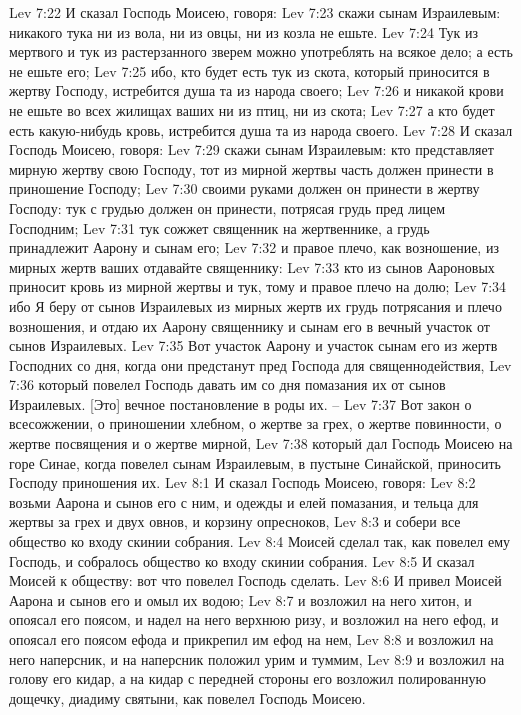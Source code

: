 Lev 7:22  И сказал Господь Моисею, говоря:
Lev 7:23  скажи сынам Израилевым: никакого тука ни из вола, ни из овцы, ни из козла не ешьте.
Lev 7:24  Тук из мертвого и тук из растерзанного зверем можно употреблять на всякое дело; а есть не ешьте его;
Lev 7:25  ибо, кто будет есть тук из скота, который приносится в жертву Господу, истребится душа та из народа своего;
Lev 7:26  и никакой крови не ешьте во всех жилищах ваших ни из птиц, ни из скота;
Lev 7:27  а кто будет есть какую-нибудь кровь, истребится душа та из народа своего.
Lev 7:28  И сказал Господь Моисею, говоря:
Lev 7:29  скажи сынам Израилевым: кто представляет мирную жертву свою Господу, тот из мирной жертвы часть должен принести в приношение Господу;
Lev 7:30  своими руками должен он принести в жертву Господу: тук с грудью должен он принести, потрясая грудь пред лицем Господним;
Lev 7:31  тук сожжет священник на жертвеннике, а грудь принадлежит Аарону и сынам его;
Lev 7:32  и правое плечо, как возношение, из мирных жертв ваших отдавайте священнику:
Lev 7:33  кто из сынов Аароновых приносит кровь из мирной жертвы и тук, тому и правое плечо на долю;
Lev 7:34  ибо Я беру от сынов Израилевых из мирных жертв их грудь потрясания и плечо возношения, и отдаю их Аарону священнику и сынам его в вечный участок от сынов Израилевых.
Lev 7:35  Вот участок Аарону и участок сынам его из жертв Господних со дня, когда они предстанут пред Господа для священнодействия,
Lev 7:36  который повелел Господь давать им со дня помазания их от сынов Израилевых. [Это] вечное постановление в роды их. --
Lev 7:37  Вот закон о всесожжении, о приношении хлебном, о жертве за грех, о жертве повинности, о жертве посвящения и о жертве мирной,
Lev 7:38  который дал Господь Моисею на горе Синае, когда повелел сынам Израилевым, в пустыне Синайской, приносить Господу приношения их.
Lev 8:1  И сказал Господь Моисею, говоря:
Lev 8:2  возьми Аарона и сынов его с ним, и одежды и елей помазания, и тельца для жертвы за грех и двух овнов, и корзину опресноков,
Lev 8:3  и собери все общество ко входу скинии собрания.
Lev 8:4  Моисей сделал так, как повелел ему Господь, и собралось общество ко входу скинии собрания.
Lev 8:5  И сказал Моисей к обществу: вот что повелел Господь сделать.
Lev 8:6  И привел Моисей Аарона и сынов его и омыл их водою;
Lev 8:7  и возложил на него хитон, и опоясал его поясом, и надел на него верхнюю ризу, и возложил на него ефод, и опоясал его поясом ефода и прикрепил им ефод на нем,
Lev 8:8  и возложил на него наперсник, и на наперсник положил урим и туммим,
Lev 8:9  и возложил на голову его кидар, а на кидар с передней стороны его возложил полированную дощечку, диадиму святыни, как повелел Господь Моисею.
